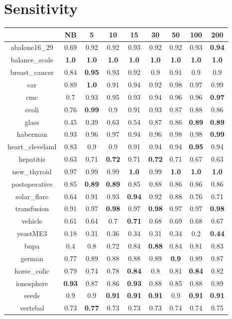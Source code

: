 \documentclass{article}%
\begin{document}
%
\section*{Sensitivity}%
\begin{tabular}{c|cccccccc}%
\hline%
&NB&5&10&15&30&50&100&200\\%
\hline%
abalone16\_29&0.69&0.92&0.92&0.93&0.92&0.92&0.93&\textbf{0.94}\\%
\hline%
balance\_scale&\textbf{1.0}&\textbf{1.0}&\textbf{1.0}&\textbf{1.0}&\textbf{1.0}&\textbf{1.0}&\textbf{1.0}&\textbf{1.0}\\%
\hline%
breast\_cancer&0.84&\textbf{0.95}&0.93&0.92&0.9&0.91&0.9&0.9\\%
\hline%
car&0.89&\textbf{1.0}&0.91&0.94&0.92&0.98&0.97&0.99\\%
\hline%
cmc&0.7&0.93&0.95&0.93&0.94&0.96&0.96&\textbf{0.97}\\%
\hline%
ecoli&0.76&\textbf{0.99}&0.9&0.91&0.93&0.87&0.88&0.86\\%
\hline%
glass&0.45&0.39&0.63&0.54&0.87&0.86&\textbf{0.89}&\textbf{0.89}\\%
\hline%
haberman&0.93&0.96&0.97&0.94&0.96&0.98&0.98&\textbf{0.99}\\%
\hline%
heart\_cleveland&0.83&0.9&0.9&0.91&0.94&0.94&\textbf{0.95}&0.94\\%
\hline%
hepatitis&0.63&0.71&\textbf{0.72}&0.71&\textbf{0.72}&0.71&0.67&0.63\\%
\hline%
new\_thyroid&0.97&0.99&0.99&\textbf{1.0}&0.99&\textbf{1.0}&\textbf{1.0}&\textbf{1.0}\\%
\hline%
postoperative&0.85&\textbf{0.89}&\textbf{0.89}&0.85&0.88&0.86&0.86&0.86\\%
\hline%
solar\_flare&0.64&0.91&0.93&\textbf{0.94}&0.92&0.88&0.76&0.71\\%
\hline%
transfusion&0.91&0.97&\textbf{0.98}&0.97&\textbf{0.98}&0.97&0.97&\textbf{0.98}\\%
\hline%
vehicle&0.61&0.64&0.7&\textbf{0.71}&0.68&0.69&0.68&0.67\\%
\hline%
yeastME3&0.18&0.31&0.36&0.34&0.31&0.34&0.2&\textbf{0.44}\\%
\hline%
bupa&0.4&0.8&0.72&0.84&\textbf{0.88}&0.84&0.81&0.83\\%
\hline%
german&0.77&0.89&0.88&0.88&0.89&\textbf{0.9}&0.89&0.87\\%
\hline%
horse\_colic&0.79&0.74&0.78&\textbf{0.84}&0.8&0.81&\textbf{0.84}&0.82\\%
\hline%
ionosphere&\textbf{0.93}&0.87&0.86&\textbf{0.93}&0.88&0.85&0.88&0.89\\%
\hline%
seeds&0.9&0.9&\textbf{0.91}&\textbf{0.91}&\textbf{0.91}&0.9&\textbf{0.91}&\textbf{0.91}\\%
\hline%
vertebal&0.73&\textbf{0.77}&0.73&0.73&0.73&0.74&0.74&0.75\\%
\hline%
\end{tabular}
\end{document}
